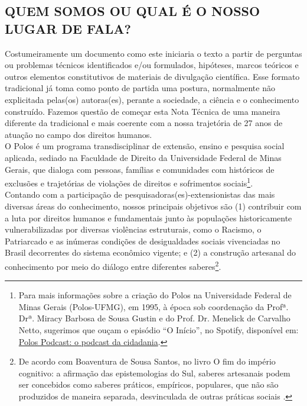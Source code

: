 \documentclass[14pt]{extarticle}
\begin{document}

\newpage
\thispagestyle{empty}
\doublespacing
\tableofcontents
\newpage
\listoffigures
\newpage
\listoftables
\singlespacing

\newpage

\setcounter{section}{0}
\setcounter{page}{1}
\doublespacing

\begin{center}
\section*{QUEM SOMOS OU QUAL É O NOSSO LUGAR DE FALA?}
\end{center}
\vspace{1cm}

Costumeiramente um documento como este iniciaria o texto a partir de perguntas ou problemas técnicos identificados e/ou formulados, hipóteses, marcos teóricos e outros elementos constitutivos de materiais de divulgação científica. Esse formato tradicional já toma como ponto de partida uma postura, normalmente não explicitada pelas(os) autoras(es), perante a sociedade, a ciência e o conhecimento construído. Fazemos questão de começar esta Nota Técnica de uma maneira diferente da tradicional e mais coerente com a nossa trajetória de 27 anos de atuação no campo dos direitos humanos.\\

O Polos é um programa transdisciplinar de extensão, ensino e pesquisa social aplicada, sediado na Faculdade de Direito da Universidade Federal de Minas Gerais, que dialoga com pessoas, famílias e comunidades com históricos de exclusões e trajetórias de violações de direitos e sofrimentos sociais\footnote{Para mais informações sobre a criação do Polos na Universidade Federal de Minas Gerais (Polos-UFMG), em 1995, à época sob coordenação da Profª. Drª. Miracy Barbosa de Sousa Gustin e do Prof. Dr. Menelick de Carvalho Netto, sugerimos que ouçam o episódio “O Início”, no Spotify, disponível em: \href{https://open.spotify.com/episode/1CVZPpNVsOnJcbsOpXUdMN?si=GNnRz4O6TBeieJzg6B4ISA&utm_source=whatsapp}{Polos Podcast: o podcast da cidadania}.}.\\

Contando com a participação de pesquisadoras(es)-extensionistas das mais diversas áreas do conhecimento, nossos principais objetivos são (1) contribuir com a luta por direitos humanos e fundamentais junto às populações historicamente vulnerabilizadas por diversas violências estruturais, como o Racismo, o Patriarcado e as inúmeras condições de desigualdades sociais vivenciadas no Brasil decorrentes do sistema econômico vigente; e (2) a construção artesanal do conhecimento por meio do diálogo entre diferentes saberes\footnote{De acordo com Boaventura de Sousa Santos, no livro O fim do império cognitivo: a afirmação das epistemologias do Sul, saberes artesanais podem ser concebidos como saberes práticos, empíricos, populares, que não são produzidos de maneira separada, desvinculada de outras práticas sociais \citep{boaventura}.}.\\
\end{document}

